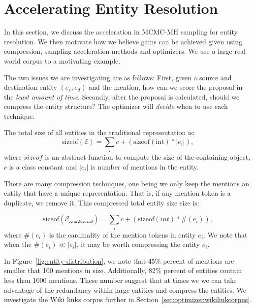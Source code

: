 
\section{Accelerating Entity Resolution}
\label{sec:optimizer:example}

In this section, we discuss the acceleration in MCMC-MH sampling for entity resolution.
We then motivate how we believe gains can be achieved given using compression,
sampling acceleration methods and optimizers.
We use a large real-world corpus to a motivating example.

The two issues we are investigating are as follows:
First, given a source and 
destination entity \((e_s, e_d)\) and the mention, how can we score the proposal in the \textit{least amount of time}.
Secondly, after the proposal is calculated, should we compress the entity structure?
The optimizer will \textit{decide} when to use each technique.

The total size of all entities in the traditional representation is:
\begin{equation}
  \text{sizeof}(\mathcal{E}) =  \sum_i c + (\text{sizeof}(\text{int}) * |e_i|),
\end{equation}
where $sizeof$ is an abstract function to compute the size of the containing object,
$c$ is a class constant and $|e_i|$ is number of mentions in the entity.

There are many compression techniques, one being we only keep the mentions an entity
that have a unique representation.
That is, if any mention token is a duplicate, we remove it.
This compressed total entity size size is:

\begin{equation}
  \text{sizeof}(\mathcal{E_\text{compressed}}) = \sum_i c + (\text{sizeof}(int) * \#(e_i) ),
\end{equation}
where $\#(e_i)$ is the cardinality of the mention tokens in entity $e_i$.
We note that when the $\#(e_i) \ll |e_i|$, it may be worth compressing the entity $e_i$.


In Figure~\ref{fig:entity-distribution}, we note that
45\% percent of mentions are smaller that 100 mentions in size.
Additionally, 82\% percent of entities contain less than 1000 mentions.
These number suggest that at times we we can take advantage of the redundancy within
large entities and compress the entities.
We investigate the Wiki links corpus further in Section~\ref{sec:optimizer:wikilinkcorpus}. 


